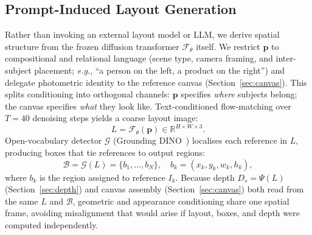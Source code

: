 \subsection{Prompt-Induced Layout Generation}
\label{sec:layout}
Rather than invoking an external layout model or LLM, we derive spatial structure from the frozen diffusion transformer $\mathcal{F}_\theta$ itself.
We restrict $\mathbf{p}$ to compositional and relational language (scene type, camera framing, and inter-subject placement; \emph{e.g.}, ``a person on the left, a product on the right'') and delegate photometric identity to the reference canvas (Section~\ref{sec:canvas}).
This splits conditioning into orthogonal channels: $\mathbf{p}$ specifies \emph{where} subjects belong; the canvas specifies \emph{what} they look like.
Text-conditioned flow-matching over $T{=}40$ denoising steps yields a coarse layout image:
\begin{equation}
  L = \mathcal{F}_\theta(\mathbf{p}) \in \mathbb{R}^{H \times W \times 3}.
\end{equation}
Open-vocabulary detector $\mathcal{G}$ (Grounding DINO~\cite{liu2023grounding}) localises each reference in $L$, producing boxes that tie references to output regions:
\begin{equation}
  \mathcal{B} = \mathcal{G}(L) = \{b_1, \ldots, b_N\}, \quad b_k = (x_k, y_k, w_k, h_k),
\end{equation}
where $b_k$ is the region assigned to reference $I_k$.
Because depth $D_s=\Psi(L)$ (Section~\ref{sec:depth}) and canvas assembly (Section~\ref{sec:canvas}) both read from the same $L$ and $\mathcal{B}$, geometric and appearance conditioning share one spatial frame, avoiding misalignment that would arise if layout, boxes, and depth were computed independently.

